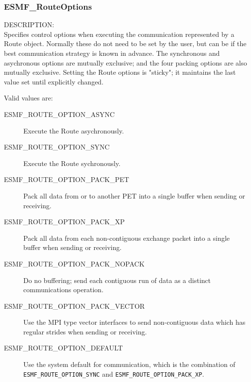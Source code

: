 
\subsubsection{ESMF\_RouteOptions}

\label{opt:routeopt}
{\sf DESCRIPTION:\\}
Specifies control options when executing the communication
represented by a Route object.  Normally these do not need to
be set by the user, but can be if the best communication strategy
is known in advance.   The synchronous and asychronous options 
are mutually exclusive; and the four packing options are also
mutually exclusive.  Setting the Route options is "sticky"; it
maintains the last value set until explicitly changed.

Valid values are:
\begin{description}
    \item [ESMF_ROUTE_OPTION_ASYNC]
	Execute the Route asychronously.
    \item [ESMF_ROUTE_OPTION_SYNC]
	Execute the Route sychronously.
    \item [ESMF_ROUTE_OPTION_PACK_PET]
        Pack all data from or to another PET into a single buffer
        when sending or receiving.
    \item [ESMF_ROUTE_OPTION_PACK_XP]
        Pack all data from each non-contiguous exchange packet 
        into a single buffer when sending or receiving.
    \item [ESMF_ROUTE_OPTION_PACK_NOPACK]
        Do no buffering; send each contiguous run of data as a distinct
        communications operation.
    \item [ESMF_ROUTE_OPTION_PACK_VECTOR]
        Use the MPI type vector interfaces to send non-contiguous data
        which has regular strides when sending or receiving.
    \item [ESMF_ROUTE_OPTION_DEFAULT]
	Use the system default for communication, which is the
        combination of {\tt ESMF\_ROUTE\_OPTION\_SYNC} and
        {\tt ESMF\_ROUTE\_OPTION\_PACK\_XP}.
\end{description}







